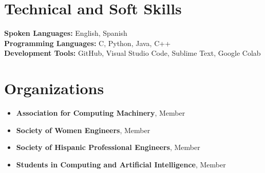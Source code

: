 \documentclass[letterpaper,11pt]{article}
\newcommand{\resumeItem}[1]{
  \item\small{
    {#1 \vspace{-2pt}}
  }
}
\newcommand{\resumeSubHeadingListStart}{\begin{itemize}[leftmargin=0.15in, label={}]}
\newcommand{\resumeSubHeadingListEnd}{\end{itemize}}
\begin{document}
\section{Technical and Soft Skills}
 \begin{itemize}[leftmargin=0.15in, label={}]
    \small{\item{
     \textbf{Spoken Languages:}{ English, Spanish} \\
     \textbf{Programming Languages:}{ C, Python, Java, C++} \\
     \textbf{Development Tools:}{ GitHub, Visual Studio Code, Sublime Text, Google Colab} \\
    }}
 \end{itemize}

\section{Organizations}

\resumeSubHeadingListStart
    \resumeItem{\textbf{Association for Computing Machinery}, Member}
    \resumeItem{\textbf{Society of Women Engineers}, Member}
    \resumeItem{\textbf{Society of Hispanic Professional Engineers}, Member}
    \resumeItem{\textbf{Students in Computing and Artificial Intelligence}, Member}
\resumeSubHeadingListEnd


\end{document}
